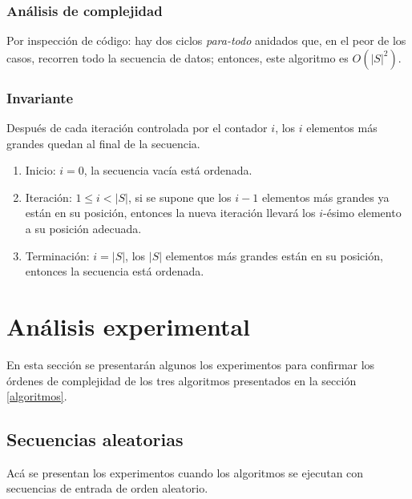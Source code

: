 \documentclass[letter]{article}
\begin{document}
\subsubsection{Análisis de complejidad} \label{algoritmos:inocente:complejidad}

Por inspección de código: hay dos ciclos {\it para-todo} anidados que, en el peor de los casos, recorren todo la secuencia de datos; entonces, este algoritmo es $O(|S|^2)$.

\subsubsection{Invariante} \label{algoritmos:inocente:invariante}

Después de cada iteración controlada por el contador $i$, los $i$ elementos más grandes quedan al final de la secuencia.

\begin{enumerate}
    \item Inicio: $i=0$, la secuencia vacía está ordenada.
    \item Iteración: $1 \le i<|S|$, si se supone que los $i-1$ elementos más grandes ya están en su posición, entonces la nueva iteración llevará los $i$-ésimo elemento a su posición adecuada.
    \item Terminación: $i=|S|$, los $|S|$ elementos más grandes están en su posición, entonces la secuencia está ordenada.
\end{enumerate}

\section{Análisis experimental} \label{experimentos}

En esta sección se presentarán algunos los experimentos para confirmar los órdenes de complejidad de los tres algoritmos presentados en la sección \ref{algoritmos}.

\subsection{Secuencias aleatorias} \label{experimentos:aleatorias}

Acá se presentan los experimentos cuando los algoritmos se ejecutan con secuencias de entrada de orden aleatorio.
\end{document}
